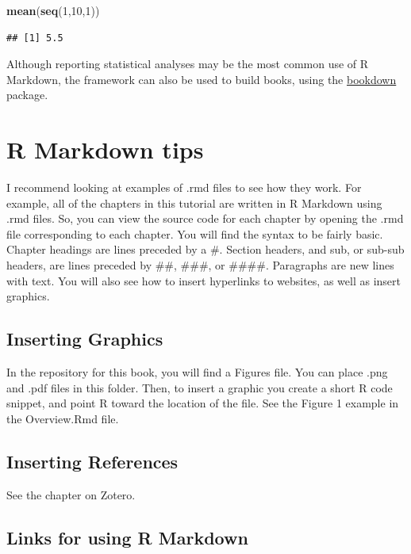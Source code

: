 \documentclass[]{book}
\newenvironment{Shaded}{\begin{snugshade}}{\end{snugshade}}
\newcommand{\KeywordTok}[1]{\textcolor[rgb]{0.13,0.29,0.53}{\textbf{{#1}}}}
\newcommand{\DecValTok}[1]{\textcolor[rgb]{0.00,0.00,0.81}{{#1}}}
\newcommand{\NormalTok}[1]{{#1}}
\theoremstyle{definition}
\theoremstyle{definition}
\theoremstyle{definition}
\theoremstyle{remark}
\begin{document}
\begin{Shaded}
\begin{Highlighting}[]
\KeywordTok{mean}\NormalTok{(}\KeywordTok{seq}\NormalTok{(}\DecValTok{1}\NormalTok{,}\DecValTok{10}\NormalTok{,}\DecValTok{1}\NormalTok{))}
\end{Highlighting}
\end{Shaded}

\begin{verbatim}
## [1] 5.5
\end{verbatim}

Although reporting statistical analyses may be the most common use of R
Markdown, the framework can also be used to build books, using the
\href{https://bookdown.org/yihui/bookdown/}{bookdown} package.

\section{R Markdown tips}\label{r-markdown-tips}

I recommend looking at examples of .rmd files to see how they work. For
example, all of the chapters in this tutorial are written in R Markdown
using .rmd files. So, you can view the source code for each chapter by
opening the .rmd file corresponding to each chapter. You will find the
syntax to be fairly basic. Chapter headings are lines preceded by a \#.
Section headers, and sub, or sub-sub headers, are lines preceded by
\#\#, \#\#\#, or \#\#\#\#. Paragraphs are new lines with text. You will
also see how to insert hyperlinks to websites, as well as insert
graphics.

\subsection{Inserting Graphics}\label{inserting-graphics}

In the repository for this book, you will find a Figures file. You can
place .png and .pdf files in this folder. Then, to insert a graphic you
create a short R code snippet, and point R toward the location of the
file. See the Figure 1 example in the Overview.Rmd file.

\subsection{Inserting References}\label{inserting-references}

See the chapter on Zotero.

\subsection{Links for using R
Markdown}\label{links-for-using-r-markdown}
\end{document}
